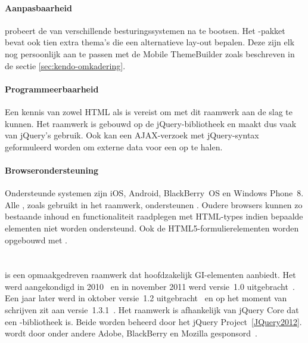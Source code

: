 \paragraph{Aanpasbaarheid}
\kendo{} probeert de  van verschillende besturingssystemen na te bootsen.
Het \kendo{}-pakket bevat ook tien extra thema's die een alternatieve lay-out bepalen.
Deze zijn elk nog persoonlijk aan te passen met de Mobile ThemeBuilder zoals beschreven in de sectie \ref{sec:kendo-omkadering}.

\paragraph{Programmeerbaarheid}
Een kennis van zowel HTML als \js{} is vereist om met dit raamwerk aan de slag te kunnen.
Het raamwerk is gebouwd op de jQuery-bibliotheek en maakt dus vaak van jQuery's  gebruik.
Ook kan een AJAX-verzoek met jQuery-syntax geformuleerd worden om externe data voor een  op te halen.

\paragraph{Browserondersteuning}
Ondersteunde systemen zijn iOS, Android, BlackBerry~OS en Windows Phone~8.
Alle , zoals gebruikt in het raamwerk, ondersteunen .
Oudere browsers kunnen zo bestaande inhoud en functionaliteit raadplegen met  HTML-types indien bepaalde elementen niet worden ondersteund.
Ook de HTML5-formulierelementen worden opgebouwd met .


\section{\jqm}
\label{sec:raamwerk-jqm}
\jqm{} is een opmaakgedreven raamwerk dat hoofdzakelijk GI-elementen aanbiedt.
Het werd aangekondigd in 2010~\cite{Resig2010} en in november 2011 werd versie~1.0 uitgebracht~\cite{Parker2011}.
Een jaar later werd in oktober versie~1.2 uitgebracht~\cite{Parker2012} en op het moment van schrijven zit \jqm{} aan versie~1.3.1~\cite{Parker2013b}. 
Het raamwerk is afhankelijk van jQuery Core dat een \js{}-bibliotheek is.
Beide worden beheerd door het jQuery Project~\ref{JQuery2012}. 
\jqm{} wordt door onder andere Adobe, BlackBerry en Mozilla gesponsord~\cite{JQuery2012a}.

